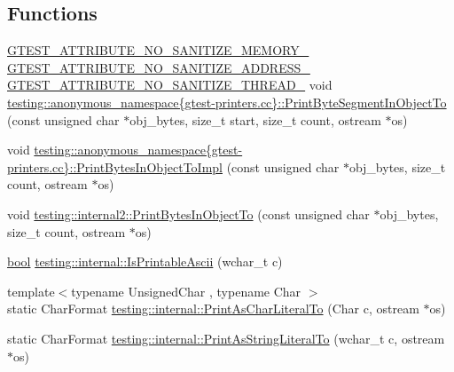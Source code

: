 \subsection*{Functions}
\begin{DoxyCompactItemize}
\item 
\hyperlink{gtest-port_8h_a2a83dd79037e53814a509cc3f5702650}{G\+T\+E\+S\+T\+\_\+\+A\+T\+T\+R\+I\+B\+U\+T\+E\+\_\+\+N\+O\+\_\+\+S\+A\+N\+I\+T\+I\+Z\+E\+\_\+\+M\+E\+M\+O\+R\+Y\+\_\+} \hyperlink{gtest-port_8h_af18b465f4ba6e36eea7a8d2d79521873}{G\+T\+E\+S\+T\+\_\+\+A\+T\+T\+R\+I\+B\+U\+T\+E\+\_\+\+N\+O\+\_\+\+S\+A\+N\+I\+T\+I\+Z\+E\+\_\+\+A\+D\+D\+R\+E\+S\+S\+\_\+} \hyperlink{gtest-port_8h_abf30a6b1b3a12ecb2cc1bc1a6f5f9646}{G\+T\+E\+S\+T\+\_\+\+A\+T\+T\+R\+I\+B\+U\+T\+E\+\_\+\+N\+O\+\_\+\+S\+A\+N\+I\+T\+I\+Z\+E\+\_\+\+T\+H\+R\+E\+A\+D\+\_\+} void \hyperlink{namespacetesting_1_1anonymous__namespace_02gtest-printers_8cc_03_ad297ce40861f170a8269e26a7df2b826}{testing\+::anonymous\+\_\+namespace\{gtest-\/printers.\+cc\}\+::\+Print\+Byte\+Segment\+In\+Object\+To} (const unsigned char $\ast$obj\+\_\+bytes, size\+\_\+t start, size\+\_\+t count, ostream $\ast$os)
\item 
void \hyperlink{namespacetesting_1_1anonymous__namespace_02gtest-printers_8cc_03_a7c3551691f3b4ab868eb5b8ceba41bde}{testing\+::anonymous\+\_\+namespace\{gtest-\/printers.\+cc\}\+::\+Print\+Bytes\+In\+Object\+To\+Impl} (const unsigned char $\ast$obj\+\_\+bytes, size\+\_\+t count, ostream $\ast$os)
\item 
void \hyperlink{namespacetesting_1_1internal2_abfb9aa80365f93b952e9a4bea09947a8}{testing\+::internal2\+::\+Print\+Bytes\+In\+Object\+To} (const unsigned char $\ast$obj\+\_\+bytes, size\+\_\+t count, ostream $\ast$os)
\item 
\hyperlink{classbool}{bool} \hyperlink{namespacetesting_1_1internal_a744a6dd74c12d1e2c16b3c03e14ed4d4}{testing\+::internal\+::\+Is\+Printable\+Ascii} (wchar\+\_\+t c)
\item 
{\footnotesize template$<$typename Unsigned\+Char , typename Char $>$ }\\static Char\+Format \hyperlink{namespacetesting_1_1internal_ab73d250fde6dfbf16111afb7a071dc3f}{testing\+::internal\+::\+Print\+As\+Char\+Literal\+To} (Char c, ostream $\ast$os)
\item 
static Char\+Format \hyperlink{namespacetesting_1_1internal_a8c5838995d7bb9e4232b69e6bcdb9ab8}{testing\+::internal\+::\+Print\+As\+String\+Literal\+To} (wchar\+\_\+t c, ostream $\ast$os)
\item 

\end{DoxyCompactItemize}
